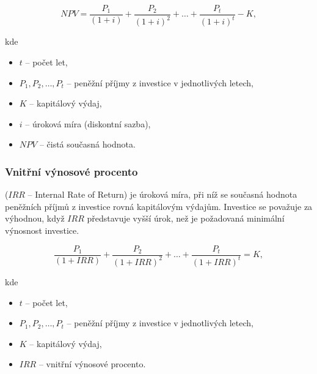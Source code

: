 \begin{equation}    
NPV = \frac{P_1}{(1+i)} + \frac{P_2}{(1+i)^2} + \ldots + \frac{P_t}{(1+i)^t} - K,
\end{equation}

kde
\begin{itemize}[label={}]
    \item $t$ -- počet let,
    \item $P_1, P_2, \ldots, P_t$ -- peněžní příjmy z investice v jednotlivých letech,
    \item $K$ -- kapitálový výdaj,
    \item $i$ -- úroková míra (diskontní sazba),
    \item $NPV$ -- čistá současná hodnota.
\end{itemize}

\subsubsection*{Vnitřní výnosové procento}
($IRR$ -- Internal Rate of Return)
je úroková míra, při níž se současná hodnota peněžních příjmů z investice rovná kapitálovým výdajům. Investice se považuje za výhodnou, když $IRR$ představuje vyšší úrok, než je požadovaná minimální výnosnost investice.

\begin{equation}
    \frac{P_1}{(1+IRR)} + \frac{P_2}{(1+IRR)^2} + \ldots + \frac{P_t}{(1+IRR)^t} = K,
\end{equation}

kde
\begin{itemize}[label={}]
    \item $t$ -- počet let,
    \item $P_1, P_2, \ldots, P_t$ -- peněžní příjmy z investice v jednotlivých letech,
    \item $K$ -- kapitálový výdaj,
    \item $IRR$ -- vnitřní výnosové procento.
\end{itemize}
